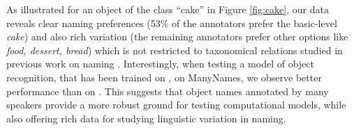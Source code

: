 As illustrated for an object of the class ``cake'' in Figure \ref{fig:cake}, our data reveals clear naming preferences (53\% of the annotators prefer the basic-level \textit{cake}) and also rich variation (the remaining annotators prefer other options like \textit{food, dessert, bread}) which is not restricted to taxonomical relations studied in previous work on naming \cite{rosch1976basic,Ordonez:2016,graf2016animal}. 
Interestingly, when testing a model of object recognition, that has been trained on \vg, on ManyNames, we observe better performance than on \vg.
This suggests that object names annotated by many speakers provide a more robust ground for testing computational models, while also offering rich data for studying linguistic variation in naming.


